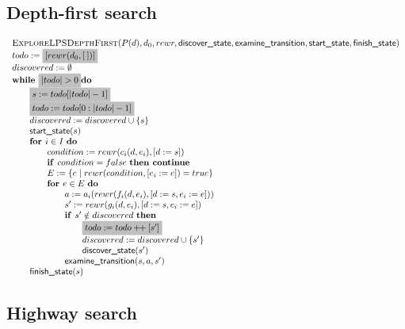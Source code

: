 \documentclass{article}
\newcommand{\concat}{\ensuremath{+\!\!+\:}}
\newcommand{\Space}{\text{\ }}
\newcommand{\If}{\text{\textbf{if }}}
\newcommand{\Do}{\text{\textbf{do }}}
\newcommand{\Then}{\text{\textbf{then }}}
\newcommand{\For}{\text{\textbf{for }}}
\newcommand{\While}{\text{\textbf{while }}}
\newcommand{\Continue}{\text{\textbf{continue }}}
\begin{document}
\subsection{Depth-first search}
\[
\begin{tabular}{l}
\textsc{ExploreLPSDepthFirst}($P(d), d_0, rewr, \textsf{discover\_state}, \textsf{examine\_transition},
\textsf{start\_state}, \textsf{finish\_state})$ \\
$todo := \colorbox{lightgray}{$[rewr(d_0, [\:])]$}$ \\
$discovered := \emptyset$ \\
$\While \colorbox{lightgray}{$|todo| > 0$} \Do$ \\
\qquad \colorbox{lightgray}{$s := todo[|todo| - 1]$} \\
\qquad \colorbox{lightgray}{$todo := todo[0:|todo| - 1]$} \\
\qquad $discovered := discovered \cup \{s\}$ \\
\qquad $\textsf{start\_state}(s)$ \\
\qquad $\For i \in I  \Space \Do$ \\
\qquad \qquad $condition := rewr(c_i(d, e_i), [d := s])$ \\
\qquad \qquad $\If condition = false  \Space \Then \Continue$ \\
\qquad \qquad $E := \{ e \mid rewr(condition, [e_i := e]) = true \}$ \\
\qquad \qquad $\For e \in E  \Space \Do$ \\
\qquad \qquad \qquad $a := a_i(rewr(f_i(d,e_i), [d:=s,e_i:=e]))$ \\
\qquad \qquad \qquad $s' := rewr(g_i(d,e_i), [d:=s,e_i:=e])$ \\
\qquad \qquad \qquad $\If s' \notin discovered \Space \Then$ \\
\qquad \qquad \qquad \qquad \colorbox{lightgray}{$todo := todo \concat [s']$} \\
\qquad \qquad \qquad \qquad $discovered := discovered \cup \{s'\}$ \\
\qquad \qquad \qquad \qquad $\textsf{discover\_state}(s')$ \\
\qquad \qquad \qquad $\textsf{examine\_transition}(s, a, s')$ \\
\qquad $\textsf{finish\_state}(s)$ \\
\end{tabular}
\]

\newpage
\subsection{Highway search}
\end{document}

